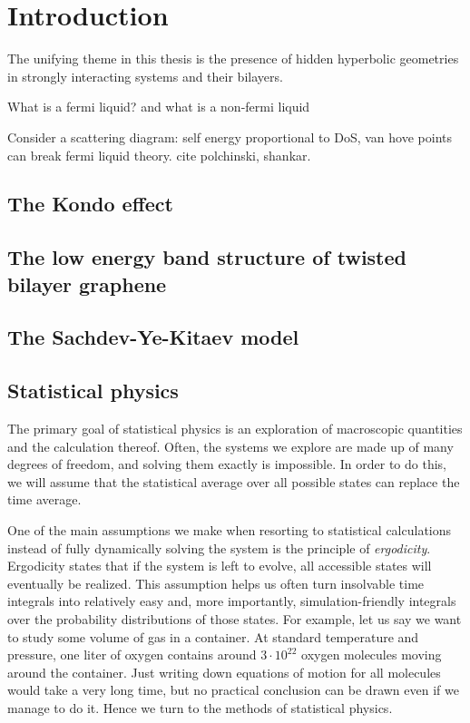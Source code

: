 \chapter{Introduction}
\label{ch:Intro}
\par
The unifying theme in this thesis is the presence of hidden hyperbolic geometries in strongly interacting systems and their bilayers. 

What is a fermi liquid? and what is a non-fermi liquid 

Consider a scattering diagram: self energy proportional to DoS, van hove points can break fermi liquid theory. cite polchinski, shankar.

\newpage     

\section{The Kondo effect}
\section{The low energy band structure of twisted bilayer graphene}

\section{The Sachdev-Ye-Kitaev model}

\section{Statistical physics}
\label{sec:statPhys}
The primary goal of statistical physics is an exploration of macroscopic quantities and the calculation thereof. Often, the systems we explore are made up of many degrees of freedom, and solving them exactly is impossible. In order to do this, we will assume that the statistical average over all possible states can replace the time average. 
\par 
One of the main assumptions we make when resorting to statistical calculations instead of fully dynamically solving the system is the principle of \textit{ergodicity}. Ergodicity states that if the system is left to evolve, all accessible states will eventually be realized. This assumption helps us often turn insolvable time integrals into relatively easy and, more importantly, simulation-friendly integrals over the probability distributions of those states. For example, let us say we want to study some volume of gas in a container. At standard temperature and pressure, one liter of oxygen contains around $3\cdot 10^{22}$ oxygen molecules moving around the container. Just writing down equations of motion for all molecules would take a very long time, but no practical conclusion can be drawn even if we manage to do it. Hence we turn to the methods of statistical physics.
\par


